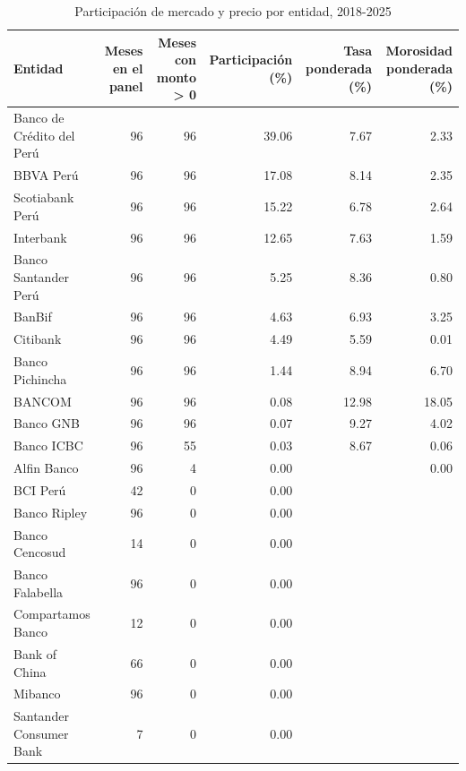 \begin{table}[htbp]
\caption{Participación de mercado y precio por entidad, 2018-2025}
\label{tab:entidades}
\begin{tabular}{lrrrrr}
\toprule
Entidad & Meses en el panel & Meses con monto > 0 & Participación (\%) & Tasa ponderada (\%) & Morosidad ponderada (\%) \\
\midrule
Banco de Crédito del Perú & 96 & 96 & 39.06 & 7.67 & 2.33 \\
BBVA Perú & 96 & 96 & 17.08 & 8.14 & 2.35 \\
Scotiabank Perú & 96 & 96 & 15.22 & 6.78 & 2.64 \\
Interbank & 96 & 96 & 12.65 & 7.63 & 1.59 \\
Banco Santander Perú & 96 & 96 & 5.25 & 8.36 & 0.80 \\
BanBif & 96 & 96 & 4.63 & 6.93 & 3.25 \\
Citibank & 96 & 96 & 4.49 & 5.59 & 0.01 \\
Banco Pichincha & 96 & 96 & 1.44 & 8.94 & 6.70 \\
BANCOM & 96 & 96 & 0.08 & 12.98 & 18.05 \\
Banco GNB & 96 & 96 & 0.07 & 9.27 & 4.02 \\
Banco ICBC & 96 & 55 & 0.03 & 8.67 & 0.06 \\
Alfin Banco & 96 & 4 & 0.00 &  & 0.00 \\
BCI Perú & 42 & 0 & 0.00 &  &  \\
Banco Ripley & 96 & 0 & 0.00 &  &  \\
Banco Cencosud & 14 & 0 & 0.00 &  &  \\
Banco Falabella & 96 & 0 & 0.00 &  &  \\
Compartamos Banco & 12 & 0 & 0.00 &  &  \\
Bank of China & 66 & 0 & 0.00 &  &  \\
Mibanco & 96 & 0 & 0.00 &  &  \\
Santander Consumer Bank & 7 & 0 & 0.00 &  &  \\
\bottomrule
\end{tabular}
\end{table}
